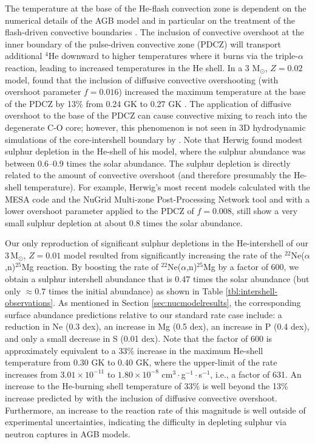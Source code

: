 The temperature at the base of the He-flash convection zone is dependent on the numerical details of the AGB model and
in particular on the treatment of the flash-driven convective boundaries \citep[e.g.,][]{Herwig:2000ua}. 
The inclusion of convective overshoot at the inner boundary of the pulse-driven convective zone (PDCZ)
will transport additional $^{4}$He downward to higher temperatures where it burns 
via the triple-$\alpha$ reaction, leading to increased temperatures in the He shell. 
In a 3 M$_\odot$, $Z=0.02$ model, \citet{Herwig:2000ua} found that the inclusion of diffusive 
convective overshooting (with overshoot parameter $f=0.016$) increased the maximum temperature 
at the base of the PDCZ by 13\% from 0.24 GK to 0.27 GK
\citep[see also Fig.~3 in][]{Lugaro:2003ew}. The application of diffusive overshoot to the base of the PDCZ can cause convective mixing to reach into the degenerate C-O core; however, this phenomenon is not seen in 3D hydrodynamic simulations of the core-intershell boundary by \citet{Stancliffe:2011dw}. Note that Herwig found modest sulphur depletion
in the He-shell of his model, where the sulphur abundance was between 0.6--0.9 times the
solar abundance. The sulphur depletion is directly related to the amount of 
convective overshoot (and therefore presumably the He-shell temperature). 
For example, Herwig's most recent models calculated with the MESA code \citep{Paxton:2011jf} and the NuGrid Multi-zone Post-Processing Network tool \citep{Herwig:2008ur,Bennett:2012gj} and with a lower overshoot parameter applied to the
PDCZ of $f = 0.008$, still show a very small sulphur depletion at about 0.8 times
the solar abundance.

Our only reproduction of significant sulphur depletions in the He-intershell 
of our 3\,M$_\odot$, $Z=0.01$ model resulted from significantly increasing the rate of the $^{22}$Ne($\alpha$,n)$^{25}$Mg reaction.
By boosting the rate of $^{22}$Ne($\alpha$,n)$^{25}$Mg by a factor of 600, we obtain
a sulphur intershell abundance that is 0.47 times the solar abundance (but only $\approx 0.7$ times
the initial abundance) as shown in Table \ref{tbl:intershell-observations}.  As mentioned in Section \ref{sec:nucmodelresults}, the corresponding surface abundance predictions relative to our standard rate case include: a reduction in 
Ne (0.3 dex), an increase in Mg (0.5 dex), an increase in P (0.4 dex), and only a 
small decrease in S (0.01 dex). 
Note that the factor of 600 is approximately equivalent to a 33\% increase in the maximum He-shell temperature
from 0.30 GK to 0.40 GK, where the upper-limit of the \citet{Iliadis:2010eu} rate
increases from $3.01 \times 10^{-11}$ to $1.80 \times 10^{-8}$ cm$^3\cdot$g$^{-1}\cdot$s$^{-1}$, i.e., 
a factor of 631. An increase to the He-burning shell temperature of 33\% is well beyond the 13\% increase predicted by \citet{Herwig:2000ua} with the inclusion of diffusive convective overshoot. Furthermore, an increase to the reaction rate of this magnitude is well outside of experimental uncertainties, indicating the difficulty in depleting sulphur via neutron captures in AGB models.

